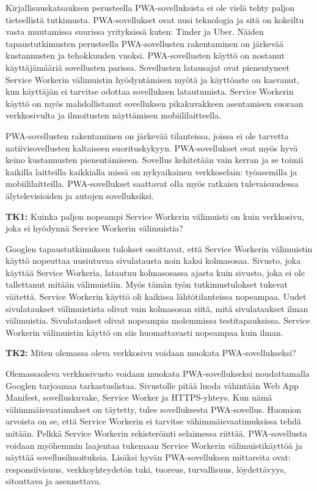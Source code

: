 \documentclass{tktltiki}
\begin{document}
Kirjallisuuskatsauksen perusteella PWA-sovelluksista ei ole vielä tehty paljon tieteellistä tutkimusta. PWA-sovellukset ovat uusi teknologia ja sitä on kokeiltu vasta muutamissa suurissa yrityksissä kuten: Tinder ja Uber. Näiden tapaustutkimusten perusteella PWA-sovellusten rakentaminen on järkevää kustannusten ja tehokkuuden vuoksi. PWA-sovellusten käyttö on nostanut käyttäjämääriä sovellusten parissa. Sovellusten latausajat ovat pienentyneet Service Workerin välimuistin hyödyntämisen myötä ja käyttöaste on kasvanut, kun käyttäjän ei tarvitse odottaa sovelluksen latautumista. Service Workerin käyttö on myös mahdollistanut sovelluksen pikakuvakkeen asentamisen suoraan verkkosivulta ja ilmoitusten näyttämisen mobiililaitteella. 

PWA-sovellusten rakentaminen on järkevää tilanteissa, joissa ei ole tarvetta natiivisovellusten kaltaiseen suorituskykyyn. PWA-sovellukset ovat myös hyvä keino kustannusten pienentämiseen. Sovellus kehitetään vain kerran ja se toimii kaikilla laitteilla kaikkialla missä on nykyaikainen verkkoselain: työasemilla ja mobiililaitteilla. PWA-sovellukset saattavat olla myös ratkaisu tulevaisuudessa älytelevisioiden ja autojen sovelluksiksi.

\textbf{TK1:} Kuinka paljon nopeampi Service Workerin välimuisti on kuin verkkosivu, joka ei hyödynnä Service Workerin välimuistia?

Googlen tapaustutkimuksen tulokset osoittavat, että Service Workerin välimuistin käyttö nopeuttaa uusiutuvaa sivulatausta noin kaksi kolmasosaa. Sivusto, joka käyttää Service Workeria, latautuu kolmasosassa ajasta kuin sivusto, joka ei ole tallettanut mitään välimuistiin. Myös tämän työn tutkimustulokset tukevat väitettä. Service Workerin käyttö oli kaikissa lähtötilanteissa nopeampaa. Uudet sivulataukset välimuistista olivat vain kolmasosan siitä, mitä sivulataukset ilman välimuistia. Sivulataukset olivat nopeampia molemmissa testitapauksissa. Service Workerin välimuistin käyttö on siis huomattavasti nopeampaa kuin ilman.

\textbf{TK2:} Miten olemassa oleva verkkosivu voidaan muokata PWA-sovellukseksi?

Olemassaoleva verkkosivusto voidaan muokata PWA-sovellukseksi noudattamalla Googlen tarjoamaa tarkastuslistaa. Sivustolle pitää luoda vähintään Web App Manifest, sovelluskuvake, Service Worker ja HTTPS-yhteys. Kun nämä vähimmäisvaatimukset on täytetty, tulee sovelluksesta PWA-sovellus. Huomion arvoista on se, että Service Workerin ei tarvitse vähimmäisvaatimuksissa tehdä mitään. Pelkkä Service Workerin rekisteröinti selaimessa riittää. PWA-sovellusta voidaan myöhemmin laajentaa tukemaan Service Workerin välimuistikäyttöä ja näyttää sovellusilmoituksia. Lisäksi hyvän PWA-sovelluksen mittareita ovat: responsiivisuus, verkkoyhteydetön tuki, tuoreus, turvallisuus, löydettävyys, sitouttava ja asennettava.
\end{document}
